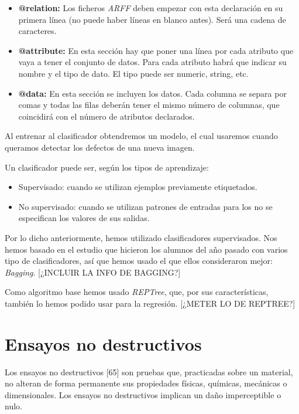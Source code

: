 \begin{itemize}
\item \textbf{@relation:} Los ficheros \textit{ARFF} deben empezar con esta declaración en su primera línea (no puede haber líneas en blanco antes). Será una cadena de caracteres.

\item \textbf{@attribute:} En esta sección hay que poner una línea por cada atributo que vaya a tener el conjunto de datos. Para cada atributo habrá que indicar su nombre y el tipo de dato. El tipo puede ser numeric, string, etc.

\item \textbf{@data:} En esta sección se incluyen los datos. Cada columna se separa por comas y todas las
filas deberán tener el mismo número de columnas, que coincidirá con el número de atributos declarados.
\end{itemize}

Al entrenar al clasificador obtendremos un modelo, el cual usaremos cuando queramos detectar los defectos de una nueva imagen.

Un clasificador puede ser, según los tipos de aprendizaje:

\begin{itemize}
\item Supervisado: cuando se utilizan ejemplos previamente etiquetados.
\item No supervisado: cuando se utilizan patrones de entradas para los no se especifican los valores
de sus salidas.
\end{itemize}

Por lo dicho anteriormente, hemos utilizado clasificadores supervisados. Nos hemos basado en el estudio que hicieron los alumnos del año pasado con varios tipo de clasificadores, así que hemos usado el que ellos consideraron mejor: \textit{Bagging}. [¿INCLUIR LA INFO DE BAGGING?]

Como algoritmo base hemos usado \textit{REPTree}, que, por sus características, también lo hemos podido usar para la regresión. [¿METER LO DE REPTREE?]

\section{Ensayos no destructivos}
Los ensayos no destructivos [65] son pruebas que, practicadas sobre un material, no alteran de forma permanente sus propiedades físicas, químicas, mecánicas o dimensionales. Los ensayos no destructivos implican un daño imperceptible o nulo.

